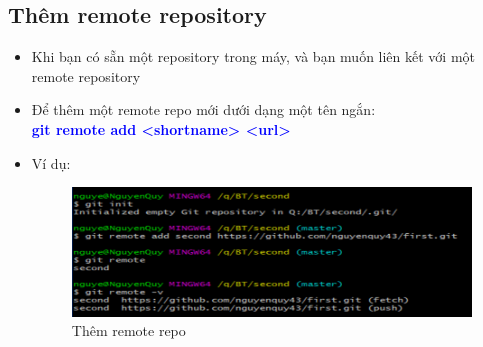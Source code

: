 \documentclass[12pt,a4paper]{report}
\begin{document}
\subsection{Thêm remote repository} 
\begin{itemize}
\item Khi bạn có sẵn một repository trong máy, và bạn muốn liên kết với một remote repository
\item Để thêm một remote repo mới dưới dạng một tên ngắn:\\ \textcolor{blue}{\bf git remote add <shortname> <url>}
\item Ví dụ: 

\begin{figure}[!ht]
	\centering
	\includegraphics[width=0.8\linewidth]{screenshot034}
\caption{Thêm remote repo}	
	\label{fig:screenshot034}
	\end{figure}
\end{itemize}
\end{document}
